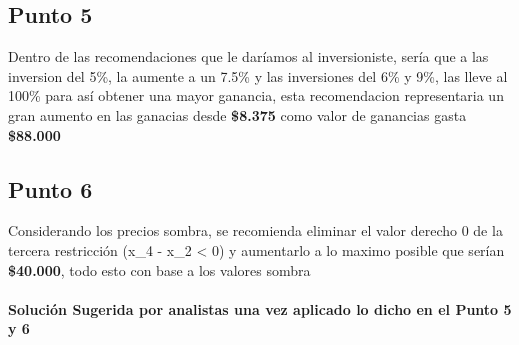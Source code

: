 \documentclass[
]{article}
\begin{document}
\hypertarget{punto-5}{%
\subsection{Punto 5}\label{punto-5}}

Dentro de las recomendaciones que le daríamos al inversioniste, sería
que a las inversion del 5\%, la aumente a un 7.5\% y las inversiones del
6\% y 9\%, las lleve al 100\% para así obtener una mayor ganancia, esta
recomendacion representaria un gran aumento en las ganacias desde
\textbf{\$8.375} como valor de ganancias gasta \textbf{\$88.000}

\hypertarget{punto-6}{%
\subsection{Punto 6}\label{punto-6}}

Considerando los precios sombra, se recomienda eliminar el valor derecho
0 de la tercera restricción (x\_4 - x\_2 \textless{} 0) y aumentarlo a
lo maximo posible que serían \textbf{\$40.000}, todo esto con base a los
valores sombra

\hypertarget{soluciuxf3n-sugerida-por-analistas-una-vez-aplicado-lo-dicho-en-el-punto-5-y-6}{%
\paragraph{Solución Sugerida por analistas una vez aplicado lo dicho en
el Punto 5 y
6}\label{soluciuxf3n-sugerida-por-analistas-una-vez-aplicado-lo-dicho-en-el-punto-5-y-6}}
\end{document}
